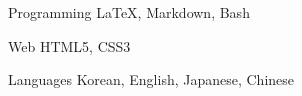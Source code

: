 


\begin{cvskills}


\cvskill
{Programming} %
{LaTeX, Markdown, Bash} %


\cvskill
{Web} %
{HTML5, CSS3} %


\cvskill
{Languages} %
{Korean, English, Japanese, Chinese} %


\end{cvskills}
